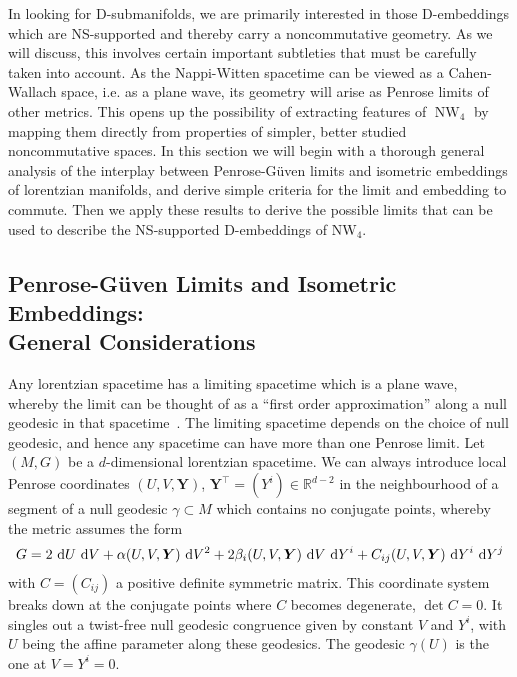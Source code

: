 \documentclass[11pt,a4paper]{article}
\DeclareMathOperator{\NW}{NW}
\newcommand{\mbf}[1]{{\boldsymbol {#1} }}
\def\dd{{\rm d}}
\newcommand{\real}{{\mathbb R}} %
\newcommand{\beq}{\begin{eqnarray}}
\newcommand{\eeq}{\end{eqnarray}}
\begin{document}
In looking for D-submanifolds, we are primarily interested in those
D-embeddings which are NS-supported and thereby carry a noncommutative
geometry. As we will discuss, this involves certain
important subtleties that must be carefully taken into account. As the
Nappi-Witten spacetime can be viewed as a Cahen-Wallach space, i.e. as
a plane wave, its geometry will arise as Penrose limits of other
metrics. This opens up the possibility of extracting features of
$\NW_4$ by mapping them directly from properties of simpler, better
studied noncommutative spaces. In
this section we will begin with a thorough general analysis of the interplay
between Penrose-G\"uven limits and isometric embeddings of lorentzian
manifolds, and derive simple criteria for the limit and embedding to
commute. Then we apply these results to derive the possible limits
that can be used to describe the NS-supported D-embeddings of NW$_4$.

\subsection{Penrose-G\"uven Limits and Isometric Embeddings: \\ General
  Considerations \label{PGLIE}}

Any lorentzian spacetime has a limiting spacetime which is a plane
wave, whereby the limit can be thought of as a ``first order
approximation'' along a null geodesic in that
spacetime~\cite{Penrose1}. The limiting spacetime depends on the
choice of null geodesic, and hence any spacetime can have more than
one Penrose limit. Let $(M,G)$ be a $d$-dimensional lorentzian
spacetime. We can always introduce local Penrose coordinates
$(U,V,\mbf Y)$, $\mbf Y^\top=(Y^i)\in\real^{d-2}$ in the neighbourhood
of a segment of a null geodesic $\gamma\subset M$ which contains no
conjugate points, whereby the metric assumes the form~\cite{LP1}
\beq
G=2~\dd U~\dd V+\alpha(U,V,\mbf Y)~\dd V^2+2\beta_i
(U,V,\mbf Y)~\dd V~\dd Y^i+C_{ij}(U,V,
\mbf Y)~\dd Y^i~\dd Y^j
\label{GPenrose}\eeq
with $C=(C_{ij})$ a positive definite symmetric matrix. This
coordinate system breaks down at the conjugate points where $C$
becomes degenerate, $\det C=0$. It singles out a twist-free null
geodesic congruence given by constant $V$ and $Y^i$, with $U$ being
the affine parameter along these geodesics. The geodesic $\gamma(U)$
is the one at $V=Y^i=0$.
\end{document}
